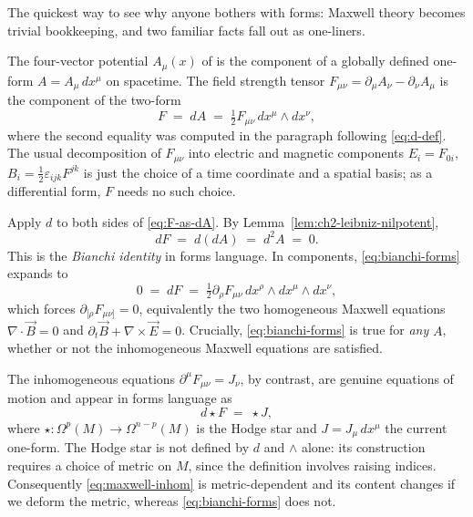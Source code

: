The quickest way to see why anyone bothers with forms: Maxwell theory becomes trivial bookkeeping, and two familiar facts fall out as one-liners.

\begin{example}\label{ex:maxwell-forms}
The four-vector potential $A_\mu(x)$ of \cite[Ch.~8]{Schwartz2014QFT} is the component of a globally defined one-form $A = A_\mu\,dx^\mu$ on spacetime. The field strength tensor $F_{\mu\nu} = \partial_\mu A_\nu - \partial_\nu A_\mu$ is the component of the two-form
\begin{equation}\label{eq:F-as-dA}
F \;=\; dA \;=\; \tfrac{1}{2}F_{\mu\nu}\,dx^\mu\wedge dx^\nu,
\end{equation}
where the second equality was computed in the paragraph following \eqref{eq:d-def}. The usual decomposition of $F_{\mu\nu}$ into electric and magnetic components $E_i = F_{0i}$, $B_i = \tfrac{1}{2}\varepsilon_{ijk}F^{jk}$ is just the choice of a time coordinate and a spatial basis; as a differential form, $F$ needs no such choice.

\medskip

\noindent Apply $d$ to both sides of \eqref{eq:F-as-dA}. By Lemma~\ref{lem:ch2-leibniz-nilpotent},
\begin{equation}\label{eq:bianchi-forms}
dF \;=\; d(dA) \;=\; d^2 A \;=\; 0.
\end{equation}
This is the \emph{Bianchi identity} in forms language. In components, \eqref{eq:bianchi-forms} expands to
\begin{equation*}
0 \;=\; dF \;=\; \tfrac{1}{2}\partial_\rho F_{\mu\nu}\,dx^\rho\wedge dx^\mu\wedge dx^\nu,
\end{equation*}
which forces $\partial_{[\rho}F_{\mu\nu]} = 0$, equivalently the two homogeneous Maxwell equations $\nabla\cdot\vec{B} = 0$ and $\partial_t\vec{B} + \nabla\times\vec{E} = 0$. Crucially, \eqref{eq:bianchi-forms} is true for \emph{any} $A$, whether or not the inhomogeneous Maxwell equations are satisfied.

\medskip

\noindent The inhomogeneous equations $\partial^\mu F_{\mu\nu} = J_\nu$, by contrast, are genuine equations of motion and appear in forms language as
\begin{equation}\label{eq:maxwell-inhom}
d \star F \;=\; \star J,
\end{equation}
where $\star : \Omega^p(M) \to \Omega^{n-p}(M)$ is the Hodge star and $J = J_\mu\, dx^\mu$ the current one-form. The Hodge star is not defined by $d$ and $\wedge$ alone: its construction requires a choice of metric on $M$, since the definition involves raising indices. Consequently \eqref{eq:maxwell-inhom} is metric-dependent and its content changes if we deform the metric, whereas \eqref{eq:bianchi-forms} does not.


\end{example}
